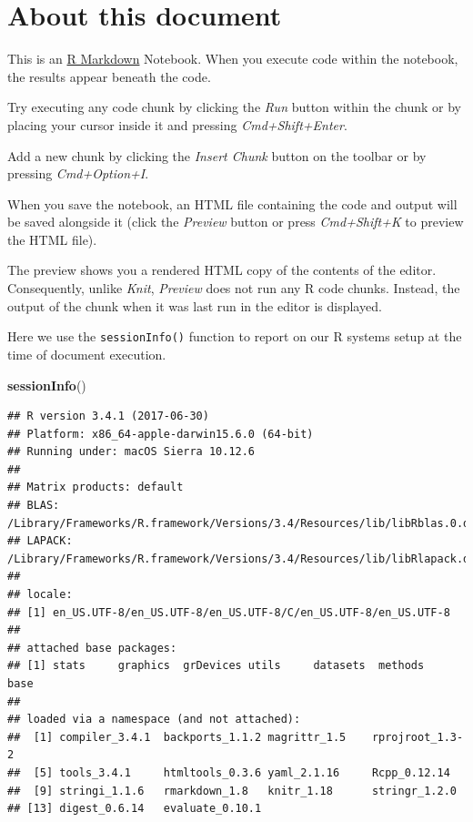 \documentclass[]{article}
\newenvironment{Shaded}{\begin{snugshade}}{\end{snugshade}}
\newcommand{\KeywordTok}[1]{\textcolor[rgb]{0.13,0.29,0.53}{\textbf{#1}}}
\newcommand{\NormalTok}[1]{#1}
\begin{document}
\section{About this document}\label{about-this-document}

This is an \href{http://rmarkdown.rstudio.com}{R Markdown} Notebook.
When you execute code within the notebook, the results appear beneath
the code.

Try executing any code chunk by clicking the \emph{Run} button within
the chunk or by placing your cursor inside it and pressing
\emph{Cmd+Shift+Enter}.

Add a new chunk by clicking the \emph{Insert Chunk} button on the
toolbar or by pressing \emph{Cmd+Option+I}.

When you save the notebook, an HTML file containing the code and output
will be saved alongside it (click the \emph{Preview} button or press
\emph{Cmd+Shift+K} to preview the HTML file).

The preview shows you a rendered HTML copy of the contents of the
editor. Consequently, unlike \emph{Knit}, \emph{Preview} does not run
any R code chunks. Instead, the output of the chunk when it was last run
in the editor is displayed.

Here we use the \texttt{sessionInfo()} function to report on our R
systems setup at the time of document execution.

\begin{Shaded}
\begin{Highlighting}[]
\KeywordTok{sessionInfo}\NormalTok{()}
\end{Highlighting}
\end{Shaded}

\begin{verbatim}
## R version 3.4.1 (2017-06-30)
## Platform: x86_64-apple-darwin15.6.0 (64-bit)
## Running under: macOS Sierra 10.12.6
## 
## Matrix products: default
## BLAS: /Library/Frameworks/R.framework/Versions/3.4/Resources/lib/libRblas.0.dylib
## LAPACK: /Library/Frameworks/R.framework/Versions/3.4/Resources/lib/libRlapack.dylib
## 
## locale:
## [1] en_US.UTF-8/en_US.UTF-8/en_US.UTF-8/C/en_US.UTF-8/en_US.UTF-8
## 
## attached base packages:
## [1] stats     graphics  grDevices utils     datasets  methods   base     
## 
## loaded via a namespace (and not attached):
##  [1] compiler_3.4.1  backports_1.1.2 magrittr_1.5    rprojroot_1.3-2
##  [5] tools_3.4.1     htmltools_0.3.6 yaml_2.1.16     Rcpp_0.12.14   
##  [9] stringi_1.1.6   rmarkdown_1.8   knitr_1.18      stringr_1.2.0  
## [13] digest_0.6.14   evaluate_0.10.1
\end{verbatim}
\end{document}
